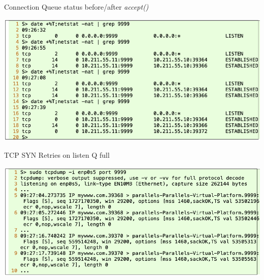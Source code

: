 \begin{table}[H]

\vspace{-.9cm}

\centering
\caption{Connection Queue status before/after \textit{accept()}}\label{tab06}
\includegraphics[scale=2.35]{src/Figures/chap1/tab06.jpg}
\end{table}

\begin{table}[H]

\vspace{-.7cm}
\centering
\caption{TCP SYN Retries on listen Q full}\label{tab07}
\includegraphics[scale=2.35]{src/Figures/chap1/tab07.jpg}
\end{table}

\vspace{-.6cm}

